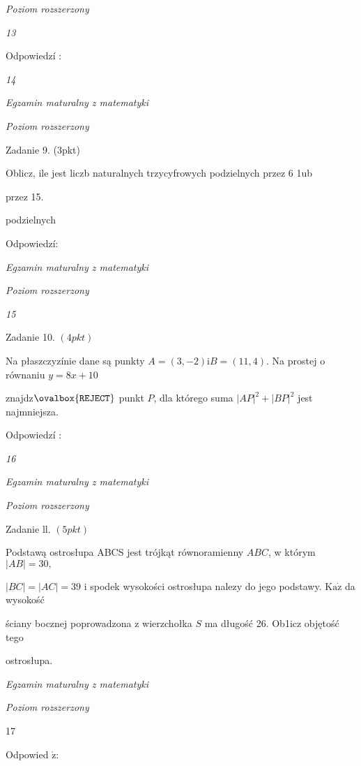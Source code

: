 \documentclass[a4paper,12pt]{article}
\begin{document}
{\it Poziom rozszerzony}

{\it 13}

Odpowiedzí :





{\it 14}

{\it Egzamin maturalny z matematyki}

{\it Poziom rozszerzony}

Zadanie 9. (3pkt)

Oblicz, ile jest liczb naturalnych trzycyfrowych podzielnych przez 6 1ub

przez 15.

podzielnych

Odpowiedzí:





{\it Egzamin maturalny z matematyki}

{\it Poziom rozszerzony}

{\it 15}

Zadanie 10. $(4pkt)$

Na płaszczyzínie dane są punkty $A=(3,-2) \mathrm{i}B=(11,4)$. Na prostej o równaniu $y=8x+10$

znajdz$\ovalbox{\tt\small REJECT}$ punkt $P$, dla którego suma $|AP|^{2}+|BP|^{2}$ jest najmniejsza.

Odpowiedzí :





{\it 16}

{\it Egzamin maturalny z matematyki}

{\it Poziom rozszerzony}

Zadanie ll. $(5pkt)$

Podstawą ostrosłupa ABCS jest trójkąt równoramienny $ABC$, w którym $|AB|=30,$

$|BC|=|AC|=39$ i spodek wysokości ostrosłupa nalez$\mathrm{y}$ do jego podstawy. $\mathrm{K}\mathrm{a}\dot{\mathrm{z}}$ da wysokość

ściany bocznej poprowadzona z wierzchołka $S$ ma długość 26. Ob1icz objętość tego

ostrosłupa.





{\it Egzamin maturalny z matematyki}

{\it Poziom rozszerzony}

17

Odpowied $\acute{\mathrm{z}}$:
\end{document}
